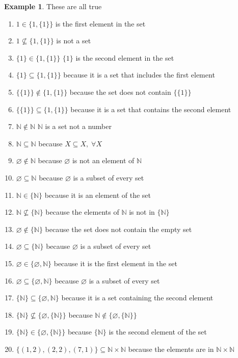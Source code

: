 \documentclass[10pt]{article}
\newcommand{\N}{\mathbb{N}}
\theoremstyle{definition}
\newtheorem{example}{Example}
\begin{document}
    \begin{example}
        These are all true
        \begin{enumerate}[label=\arabic*., leftmargin=*, align=left]
            \item $1 \in \{1, \{1\}\}$  is the first element in the set
            \item $1 \not\subseteq \{1,\{1\}\}$  is not a set
            \item $\{1\} \in \{1,\{1\}\}$ \dotfill $\{1\}$ is the second element in the set
            \item $\{1\} \subseteq \{1,\{1\}\}$ \dotfill because it is a set that includes the first element
            \item $\{\{1\}\} \not\in \{1,\{1\}\}$ \dotfill because the set does not contain $\{\{1\}\}$
            \item $\{\{1\}\} \subseteq \{1,\{1\}\}$ \dotfill because it is a set that contains the second element
            \item $\N \not\in \N$ \dotfill $\N$ is a set not a number
            \item $\N \subseteq \N$ \dotfill because $X \subseteq X, \; \forall X$
            \item $\varnothing \not\in \N$ \dotfill because $\varnothing$ is not an element of $\N$
            \item $\varnothing \subseteq \N$ \dotfill because $\varnothing$ is a subset of every set
            \item $\N \in \{\N\}$ \dotfill because it is an element of the set
            \item $\N \not\subseteq \{\N\}$ \dotfill because the elements of $\N$ is not in $\{\N\}$
            \item $\varnothing \not\in \{\N\}$ \dotfill because the set does not contain the empty set
            \item $\varnothing \subseteq \{\N\}$ \dotfill because $\varnothing$ is a subset of every set
            \item $\varnothing \in \{\varnothing,\N\}$ \dotfill because it is the first element in the set
            \item $\varnothing \subseteq \{\varnothing,\N\}$ \dotfill because $\varnothing$ is a subset of every set
            \item $\{\N\} \subseteq \{\varnothing,\N\}$ \dotfill because it is a set containing the second element
            \item $\{\N\} \not\subseteq \{\varnothing,\{\N\}\}$ \dotfill because $\N \not\in \{\varnothing,\{\N\}\}$
            \item $\{\N\} \in \{\varnothing,\{\N\}\}$ \dotfill because $\{\N\}$ is the second element of the set
            \item $\{(1,2),(2,2),(7,1)\} \subseteq \N\times\N$ \dotfill because the elements are in $\N\times\N$
        \end{enumerate}
    \end{example}
\end{document}
